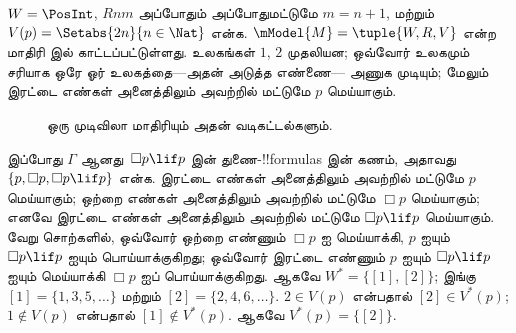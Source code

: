 \documentclass[../../../include/open-logic-section]{subfiles}
\begin{document}
\begin{ex}
  $W = \PosInt$, $Rnm$ அப்போதும் அப்போதுமட்டுமே $m = n + 1$, மற்றும்
  $V(p) = \Setabs{2n}{n \in \Nat}$ என்க.
  $\mModel{M} = \tuple{W, R, V}$ என்ற மாதிரி
   இல் காட்டப்பட்டுள்ளது. உலகங்கள் $1$, $2$
  முதலியன; ஒவ்வோர் உலகமும் சரியாக ஒரே ஓர் உலகத்தை---அதன் அடுத்த எண்ணை---
  அணுக முடியும்; மேலும் இரட்டை எண்கள் அனைத்திலும் அவற்றில் மட்டுமே $p$
  மெய்யாகும்.

  \begin{figure}
    \centering

    \caption{ஒரு முடிவிலா மாதிரியும் அதன் வடிகட்டல்களும்.}
  \end{figure}

  இப்போது $\Gamma$ ஆனது~$\Box p \lif p$ இன் துணை-!!{formula}s இன் கணம்,
  அதாவது $\{p, \Box p, \Box p \lif p\}$ என்க. இரட்டை எண்கள் அனைத்திலும்
  அவற்றில் மட்டுமே $p$ மெய்யாகும்; ஒற்றை எண்கள் அனைத்திலும் அவற்றில்
  மட்டுமே $\Box p$ மெய்யாகும்; எனவே இரட்டை எண்கள் அனைத்திலும் அவற்றில்
  மட்டுமே $\Box p \lif p$ மெய்யாகும். வேறு சொற்களில், ஒவ்வோர் ஒற்றை
  எண்ணும் $\Box p$ ஐ மெய்யாக்கி, $p$ ஐயும்~$\Box p \lif p$ ஐயும்
  பொய்யாக்குகிறது; ஒவ்வோர் இரட்டை எண்ணும் $p$ ஐயும் $\Box p \lif p$ ஐயும்
  மெய்யாக்கி $\Box p$ ஐப் பொய்யாக்குகிறது. ஆகவே
  $W^* = \{ [1], [2] \}$; இங்கு $[1] = \{1, 3, 5, \dots\}$ மற்றும்
  $[2] = \{2, 4, 6, \dots\}$. $2 \in V(p)$ என்பதால்
  $[2] \in V^*(p)$; $1 \notin V(p)$ என்பதால் $[1] \notin V^*(p)$.
  ஆகவே $V^*(p) = \{[2]\}$.


\end{ex}
\end{document}
